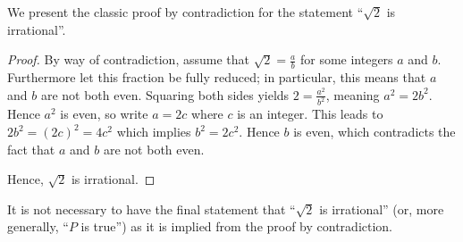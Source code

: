 \begin{example}\label{example-sqrt2-is-irrational}
    We present the classic proof by contradiction for the statement ``$\sqrt 2$ is irrational''.
    \begin{proof}
        By way of contradiction, assume that $\sqrt2 = \frac ab$ for some integers $a$ and $b$. Furthermore let this fraction be fully reduced; in particular, this means that $a$ and $b$ are not both even. Squaring both sides yields $2 = \frac{a^2}{b^2}$, meaning  $a^2 = 2b^2$. Hence $a^2$ is even, so write $a = 2c$ where $c$ is an integer. This leads to $2b^2 = (2c)^2 = 4c^2$ which implies $b^2 = 2c^2$. Hence $b$ is even, which contradicts the fact that $a$ and $b$ are not both even.

        Hence, $\sqrt 2$ is irrational.
    \end{proof}
\end{example}
\begin{remark}
    It is not necessary to have the final statement that ``$\sqrt 2$ is irrational'' (or, more generally, ``$P$ is true'') as it is implied from the proof by contradiction.
\end{remark}

